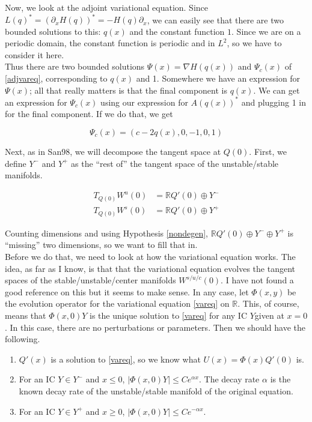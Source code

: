 \documentclass[12pt]{article}
\def\R{{\mathbb R}}
\begin{document}
Now, we look at the adjoint variational equation. Since $L(q)^* = (\partial_x H(q))^* = -H(q) \partial_x$, we can easily see that there are two bounded solutions to this: $q(x)$ and the constant function $1$. Since we are on a periodic domain, the constant function is periodic and in $L^2$, so we have to consider it here.\\

Thus there are two bounded solutions $\Psi(x) = \nabla H(q(x))$ and $\Psi_c(x)$ of \eqref{adjvareq}, corresponding to $q(x)$ and 1. Somewhere we have an expression for $\Psi(x)$; all that really matters is that the final component is $q(x)$. We can get an expression for $\Psi_c(x)$ using our expression for $A(q(x))^*$ and plugging 1 in for the final component. If we do that, we get

\[
\Psi_c(x) = (c - 2 q(x), 0, -1, 0, 1)
\]

Next, as in San98, we will decompose the tangent space at $Q(0)$. First, we define $Y^-$ and $Y^+$ as the ``rest of'' the tangent space of the unstable/stable manifolds.

\begin{align*}
T_{Q(0)} W^u(0) &= \R Q'(0) \oplus Y^- \\
T_{Q(0)} W^s(0) &= \R Q'(0) \oplus Y^+
\end{align*}

Counting dimensions and using Hypothesis \ref{nondegen}, $\R Q'(0) \oplus Y^- \oplus Y^+$ is ``missing'' two dimensions, so we want to fill that in.\\

Before we do that, we need to look at how the variational equation works. The idea, as far as I know, is that that the variational equation evolves the tangent spaces of the stable/unstable/center manifolds $W^{s/u/c}(0)$. I have not found a good reference on this but it seems to make sense. In any case, let $\Phi(x, y)$ be the evolution operator for the variational equation \eqref{vareq} on $\R$. This, of course, means that $\Phi(x, 0)Y$ is the unique solution to \eqref{vareq} for any IC $Y$given at $x = 0$. In this case, there are no perturbations or parameters. Then we should have the following.

\begin{enumerate}
	\item $Q'(x)$ is a solution to \eqref{vareq}, so we know what $U(x) = \Phi(x)Q'(0)$ is.
	\item For an IC $Y \in Y^-$ and $x \leq 0$, $|\Phi(x, 0) Y| \leq C e^{\alpha x}$. The decay rate $\alpha$ is the known decay rate of the unstable/stable manifold of the original equation.
	\item For an IC $Y \in Y^+$ and $x \geq 0$, $|\Phi(x, 0) Y| \leq C e^{-\alpha x}$. 
\end{enumerate}
\end{document}
